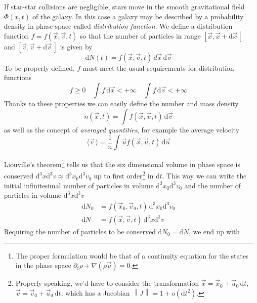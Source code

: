If star-star collisions are negligible, stars move in the smooth gravitational field $\Phi(x,t)$ of the galaxy. In this case a galaxy may be described by a probability density in phase-space called \emph{distribution function}. We define a distribution function $f = f(\vec{x}, \vec{v}, t)$ so that the number of particles in range $[\vec{x}, \vec{x}+\text{d}\vec{x}\,]$ and $[\vec{v}, \vec{v}+\text{d}\vec{v}\,]$ is given by 
\begin{equation}
    \text{d}N(t) = f(\vec{x}, \vec{v}, t)\,{d}\vec{x}\,\text{d}\vec{v}
\end{equation}
To be properly defined, $f$ must meet the usual requirements for distribution functions
\begin{equation}
    f \geqslant 0 \quad \int f\,\text{d}\vec{x} < +\infty \quad \int f\,\text{d}\vec{v} < +\infty
\end{equation}
Thanks to these properties we can easily define the number and mass density 
\begin{equation*}
    n(\vec{x}, t) = \int f(\vec{x}, \vec{v}, t)\,\text{d}\vec{v}
\end{equation*}
as well as the concept of \emph{averaged quantities}, for example the average velocity
\begin{equation*}
    \langle \vec{v}\,\rangle = \frac{1}{n}\int \vec{u}f(\vec{x}, \vec{u}, t)\,\text{d}\vec{u}
\end{equation*}
\par Liouville's theorem\footnote{The proper formulation would be that of a continuity equation for the states in the phase space $\partial_{t}\rho +\nabla(\rho\vec{v}) = 0$.} tells us that the six dimensional volume in phase space is conserved $\text{d}^{3}x\text{d}^{3}v \approx \text{d}^{3}x_{0}\text{d}^{3}v_{0}$ up to first order\footnote{Properly speaking, we'd have to consider the transformation $\vec{x} = \vec{x}_{0}+\vec{u}_{0}\,\text{d}t$, $\vec{v} = \vec{v}_{0}+\vec{a}_{0}\,\text{d}t$, which has a Jacobian $\left\|J\right\| = 1+\text{o}(\text{d}t^{2})$.} in $\text{d}t$. This way we can write the initial infinitesimal number of particles in volume $\text{d}^{3}x_{0}\text{d}^{3}v_{0}$ and the number of particles in volume $\text{d}^{3}x\text{d}^{3}v$
\begin{align*}
    \text{d}N_{0} &= f(\vec{x}_{0}, \vec{v}_{0}, t)\,\text{d}^{3}x_{0}\text{d}^{3}v_{0}\\
    \text{d}N &= f(\vec{x}, \vec{v}, t)\,\text{d}^{3}x\text{d}^{3}v
\end{align*}
Requiring the number of particles to be conserved $\text{d}N_{0} = \text{d}N$, we end up with 
